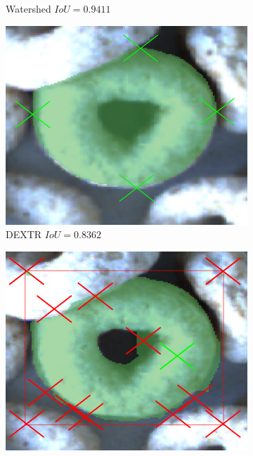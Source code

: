 \begin{figure}
\begin{subfigure}[t]{0.3\textwidth}
		\caption{Watershed $ IoU = 0.9411 $}
	\end{subfigure}
	\hfill
	\begin{subfigure}[t]{0.3\textwidth}
		\centering
		\includegraphics[width=\textwidth]{figures/appendix/method_predictions/cereal67_dextr.png}
		\caption{DEXTR $ IoU = 0.8362 $}
	\end{subfigure}
	\hfill
	\begin{subfigure}[t]{0.3\textwidth}
		\centering
		\includegraphics[width=\textwidth]{figures/appendix/method_predictions/cereal67_iog.png}
		\caption{
}
\end{subfigure}
\end{figure}
